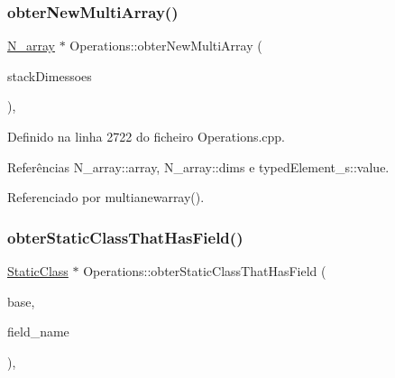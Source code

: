 \mbox{\label{classOperations_a944d6dd757fad81e350513415aaa0c72}} 
\subsubsection{\texorpdfstring{obter\+New\+Multi\+Array()}{obterNewMultiArray()}}
{\footnotesize\ttfamily \hyperlink{structN__array}{N\+\_\+array} $\ast$ Operations\+::obter\+New\+Multi\+Array (\begin{DoxyParamCaption}\item[{stack$<$ int $>$}]{stack\+Dimessoes }\end{DoxyParamCaption})\hspace{0.3cm}{\ttfamily [static]}, {\ttfamily [private]}}



Definido na linha 2722 do ficheiro Operations.\+cpp.



Referências N\+\_\+array\+::array, N\+\_\+array\+::dims e typed\+Element\+\_\+s\+::value.



Referenciado por multianewarray().

\mbox{\label{classOperations_a2e9f822a1a6b9b0fb374eafb5a55f9f4}} 
\subsubsection{\texorpdfstring{obter\+Static\+Class\+That\+Has\+Field()}{obterStaticClassThatHasField()}}
{\footnotesize\ttfamily \hyperlink{classStaticClass}{Static\+Class} $\ast$ Operations\+::obter\+Static\+Class\+That\+Has\+Field (\begin{DoxyParamCaption}\item[{\hyperlink{classStaticClass}{Static\+Class} $\ast$}]{base,  }\item[{string}]{field\+\_\+name }\end{DoxyParamCaption})\hspace{0.3cm}{\ttfamily [static]}, {\ttfamily [private]}}



